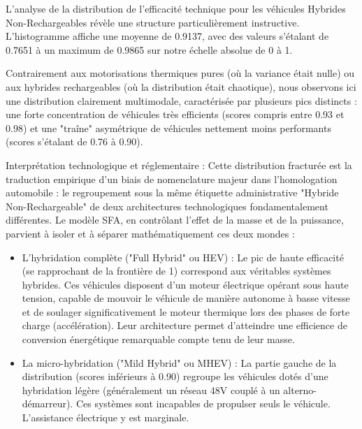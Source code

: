 L'analyse de la distribution de l'efficacité technique pour les véhicules Hybrides Non-Rechargeables révèle une structure particulièrement instructive. L'histogramme affiche une moyenne de 0.9137, avec des valeurs s'étalant de 0.7651 à un maximum de 0.9865 sur notre échelle absolue de 0 à 1.

\vspace{0.6em}

Contrairement aux motorisations thermiques pures (où la variance était nulle) ou aux hybrides rechargeables (où la distribution était chaotique), nous observons ici une distribution clairement multimodale, caractérisée par plusieurs pics distincts : une forte concentration de véhicules très efficients (scores compris entre 0.93 et 0.98) et une "traîne" asymétrique de véhicules nettement moins performants (scores s'étalant de 0.76 à 0.90).

\vspace{0.6em}

Interprétation technologique et réglementaire : Cette distribution fracturée est la traduction empirique d'un biais de nomenclature majeur dans l'homologation automobile : le regroupement sous la même étiquette administrative "Hybride Non-Rechargeable" de deux architectures technologiques fondamentalement différentes. Le modèle SFA, en contrôlant l'effet de la masse et de la puissance, parvient à isoler et à séparer mathématiquement ces deux mondes :

\vspace{0.6em}

\begin{itemize}
    \item L'hybridation complète ("Full Hybrid" ou HEV) : Le pic de haute efficacité (se rapprochant de la frontière de 1) correspond aux véritables systèmes hybrides. Ces véhicules disposent d'un moteur électrique opérant sous haute tension, capable de mouvoir le véhicule de manière autonome à basse vitesse et de soulager significativement le moteur thermique lors des phases de forte charge (accélération). Leur architecture permet d'atteindre une efficience de conversion énergétique remarquable compte tenu de leur masse.

    \vspace{0.5em}

    \item La micro-hybridation ("Mild Hybrid" ou MHEV) : La partie gauche de la distribution (scores inférieurs à 0.90) regroupe les véhicules dotés d'une hybridation légère (généralement un réseau 48V couplé à un alterno-démarreur). Ces systèmes sont incapables de propulser seuls le véhicule. L'assistance électrique y est marginale.
\end{itemize}

